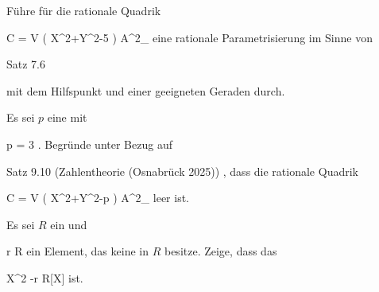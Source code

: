 {}
{





Führe für die rationale Quadrik

\mavergleichskettedisp
{\vergleichskette
{ C
}
{ =} { V \left(  X^2+Y^2-5  \right)
}
{ \subset} { {\mathbb A}^{2}_{ \Q }
}
{ } {
}
{ } {
}
}
{}{}{}
eine rationale Parametrisierung im Sinne von

Satz 7.6

mit dem Hilfspunkt
 und einer geeigneten Geraden durch.





}
{} {}

{}
{





Es sei $p$ eine
mit

\mavergleichskette
{\vergleichskette
{ p 
}
{ = }{ 3
}
{  }{
}
{    }{
}
{   }{
}
}
{}{}{.}
Begründe unter Bezug auf

Satz 9.10 (Zahlentheorie (Osnabrück 2025))
,
dass die rationale Quadrik

\mavergleichskettedisp
{\vergleichskette
{C
}
{ =} { V \left(  X^2+Y^2-p  \right)
}
{ \subset} { {\mathbb A}^{2}_{ \Q }
}
{ } {
}
{ } {
}
}
{}{}{}
leer ist.





}
{} {}

{}
{





Es sei $R$ ein
und

\mavergleichskette
{\vergleichskette
{r
}
{ \in }{ R
}
{  }{
}
{    }{
}
{   }{
}
}
{}{}{}
ein Element, das keine
in $R$ besitze. Zeige, dass das

\mavergleichskette
{\vergleichskette
{ X^2 -r
}
{ \in }{ R[X]
}
{  }{
}
{    }{
}
{   }{
}
}
{}{}{}
ist.





}
{} {}

